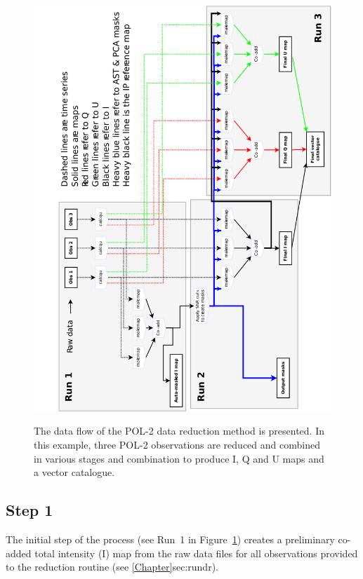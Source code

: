 \begin{figure}[t!]
\begin{center}
{\includegraphics[width=1.0\linewidth]{pol2map_flow}}
\caption [POL-2 Data Flow]{ The data flow of the POL-2 data reduction
  method is presented. In this example, three POL-2 observations are
  reduced and combined in various stages and combination to produce I,
  Q and U maps and a vector catalogue.  }
\label{fig:pol2drflow}
\end{center}
\end{figure}


\subsection*{Step 1}

The initial step of the process (see Run~1 in Figure~\ref{fig:pol2drflow})
creates a preliminary co-added total intensity
(I) map from the raw data files for all observations provided to the
reduction routine (see \cref{Chapter}{sec:rundr}{}).


